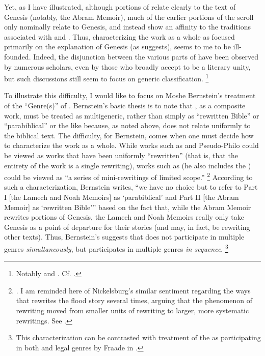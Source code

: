 Yet, as I have illustrated, although portions of \ga relate clearly to the text of Genesis (notably, the Abram Memoir), much of the earlier portions of the scroll only nominally relate to Genesis, and instead show an affinity to the traditions associated with \firstenoch and \jub. Thus, characterizing the work as a whole as focused primarily on the explanation of Genesis (as \vermes suggests), seems to me to be ill-founded. Indeed, the disjunction between the various parts of \ga have been observed by numerous scholars, even by those who broadly accept \ga to be a literary unity, but such discussions still seem to focus on generic classification.%
    \footnote{Notably \cite{bernstein_as2010} and \cite{falk2007}. Cf. \cite{eshel_roitman-etal2011}.}

To illustrate this difficulty, I would like to focus on Moshe Bernstein's treatment of the ``Genre(s)'' of \ga.%
    \autocite[As argued in][]{bernstein_berthelot-etal2010}
Bernstein's basic thesis is to note that \ga, as a composite work, must be treated as multigeneric, rather than simply as ``rewritten Bible'' or ``parabiblical'' or the like because, as noted above, \ga does not relate uniformly to the biblical text. The difficulty, for Bernstein, comes when one must decide how to characterize the work as a whole. While works such as \jub and Pseudo-Philo could be viewed as works that have been uniformly ``rewritten'' (that is, that the entirety of the work is a single rewriting), works such as \ga (he also includes the \templescroll) could be viewed as ``a series of mini-rewritings of limited scope.''%
    \footnote{\Cite[336]{bernstein_berthelot-etal2010}. I am reminded here of Nickelsburg's similar sentiment regarding the ways that \firstenoch rewrites the flood story several times, arguing that the phenomenon of rewriting moved from smaller units of rewriting to larger, more systematic rewritings. See \cite[89--90]{nickelsburg_stone1984}.}
According to such a characterization, Bernstein writes, ``we have no choice but to refer to Part I [the Lamech and Noah Memoirs] as `parabiblical' and Part II [the Abram Memoir] as `rewritten Bible''' based on the fact that, while the Abram Memoir rewrites portions of Genesis, the Lamech and Noah Memoirs really only take Genesis as a point of departure for their stories (and may, in fact, be rewriting other texts).%
    \autocite[337]{bernstein_berthelot-etal2010}
Thus, Bernstein's suggests that \ga does not participate in multiple genres \emph{simultaneously}, but participates in multiple genres \emph{in sequence}.%
    \footnote{This characterization can be contrasted with treatment of the \templescroll as participating in both \rwb and legal genres by Fraade in \cite*{fraade_goldstein-etal2017}.}
